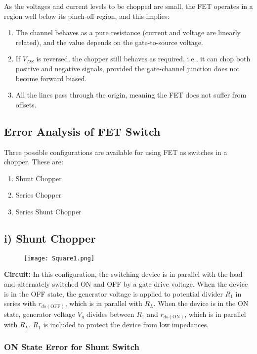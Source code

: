 \documentclass[a4paper,9pt,twoside,openany,twocolumn]{memoir}
\begin{document}
As the voltages and current levels to be chopped are small, the FET operates in a region well below its pinch-off region, and this implies:
\begin{enumerate}
    \item The channel behaves as a pure resistance (current and voltage are linearly related), and the value depends on the gate-to-source voltage.
    \item If \(V_{DS}\) is reversed, the chopper still behaves as required, i.e., it can chop both positive and negative signals, provided the gate-channel junction does not become forward biased.
    \item All the lines pass through the origin, meaning the FET does not suffer from offsets.
\end{enumerate}

\subsection*{Error Analysis of FET Switch}

Three possible configurations are available for using FET as switches in a chopper. These are:
\begin{enumerate}
    \item Shunt Chopper
    \item Series Chopper
    \item Series Shunt Chopper
\end{enumerate}

\subsection*{i) Shunt Chopper}
\begin{figure}[h]
    \centering
    \texttt{[image: Square1.png]}
    \caption{}
\end{figure}
\textbf{Circuit:}  
In this configuration, the switching device is in parallel with the load and alternately switched ON and OFF by a gate drive voltage. When the device is in the OFF state, the generator voltage is applied to potential divider \( R_1 \) in series with \( r_{ds(\text{OFF})} \), which is in parallel with \( R_L \). When the device is in the ON state, generator voltage \( V_g \) divides between \( R_1 \) and \( r_{ds(\text{ON})} \), which is in parallel with \( R_L \). \( R_1 \) is included to protect the device from low impedances.

\subsubsection*{ON State Error for Shunt Switch}
\end{document}
